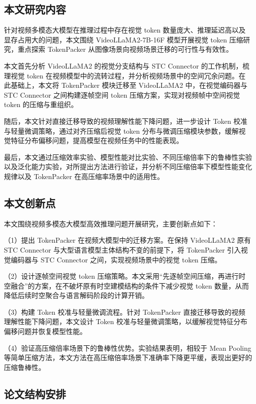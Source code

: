 \subsection{本文研究内容}

针对视频多模态大模型在推理过程中存在视觉 token 数量庞大、推理延迟高以及显存占用大的问题，本文围绕 VideoLLaMA2-7B-16F 模型开展视觉 token 压缩研究，重点探索 TokenPacker 从图像场景向视频场景迁移的可行性与有效性。

本文首先分析 VideoLLaMA2 的视觉分支结构与 STC Connector 的工作机制，梳理视觉 token 在视频模型中的流转过程，并分析视频场景中的空间冗余问题。在此基础上，本文将 TokenPacker 模块迁移至 VideoLLaMA2 中，在视觉编码器与 STC Connector 之间构建逐帧空间 token 压缩方案，实现对视频帧中空间视觉 token 的压缩与重组织。

随后，本文针对直接迁移导致的视频理解性能下降问题，进一步设计 Token 校准与轻量微调策略，通过对齐压缩后视觉 token 分布与微调压缩模块参数，缓解视觉特征分布偏移问题，提高模型在视频任务中的性能表现。

最后，本文通过压缩效率实验、模型性能对比实验、不同压缩倍率下的鲁棒性实验以及泛化能力实验，对所提出方法进行验证，并分析不同压缩倍率下模型性能变化规律以及 TokenPacker 在高压缩率场景中的适用性。

\subsection{本文创新点}

本文围绕视频多模态大模型高效推理问题开展研究，主要创新点如下：

（1）提出 TokenPacker 在视频大模型中的迁移方案。在保持 VideoLLaMA2 原有 STC Connector 与大型语言模型主体结构不变的前提下，将 TokenPacker 引入视觉编码器与 STC Connector 之间，实现视频场景中的视觉 token 压缩。

（2）设计逐帧空间视觉 token 压缩策略。本文采用“先逐帧空间压缩，再进行时空融合”的方案，在不破坏原有时空建模结构的条件下减少视觉 token 数量，从而降低后续时空聚合与语言解码阶段的计算开销。

（3）构建 Token 校准与轻量微调流程。针对 TokenPacker 直接迁移导致的视频理解性能下降问题，本文设计 Token 校准与轻量微调策略，以缓解视觉特征分布偏移问题并恢复模型性能。

（4）验证高压缩倍率场景下的鲁棒性优势。实验结果表明，相较于 Mean Pooling 等简单压缩方法，本文方法在高压缩倍率场景下准确率下降更平缓，表现出更好的压缩鲁棒性。

\subsection{论文结构安排}


